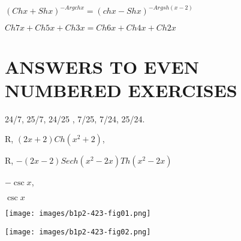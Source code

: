 \documentclass[11pt]{amsbook}
\begin{document}
\begin{hEnumerateArabic}
    \item[]
        \begin{hEnumerateAlpha}
            \item 
            $ (Ch x + Sh x )^{- Argch x} 
            	= { ( ch x - Sh x )}^{- Argsh (x-2)}  $
            \item \( Ch 7x + Ch 5x + Ch 3x = Ch 6x + Ch 4x + Ch 2x \)
        \end{hEnumerateAlpha}
\end{hEnumerateArabic}
\section*{ANSWERS TO EVEN NUMBERED EXERCISES}
\begin{hEnumerateArabic}
    \setcounter{enumi}{5}
    \item 24/7, 25/7, 24/25 , 7/25, 7/24, 25/24.
    \setcounter{enumi}{47}
    \item 
        \begin{hEnumerateAlpha}
            \item R, $(2x + 2) Ch(x^2 + 2)$,
            \item R, $-(2x - 2) Sech(x^2 - 2x) Th(x^2 - 2x)$
        \end{hEnumerateAlpha}
    \setcounter{enumi}{51}
    \item 
        \begin{hEnumerateAlpha}
            \begin{multicols}{2}
                \item $-\csc x$,
                \columnbreak
                \item $\csc x$
            \end{multicols}
        \end{hEnumerateAlpha}
    \setcounter{enumi}{53}
    \item
        \begin{hEnumerateAlpha}
            \begin{multicols}{2}
                \item 
                \texttt{[image: images/b1p2-423-fig01.png]}
                \columnbreak
                \item 
                \texttt{[image: images/b1p2-423-fig02.png]}
            \end{multicols}
        \end{hEnumerateAlpha}




\end{hEnumerateArabic}
\end{document}
